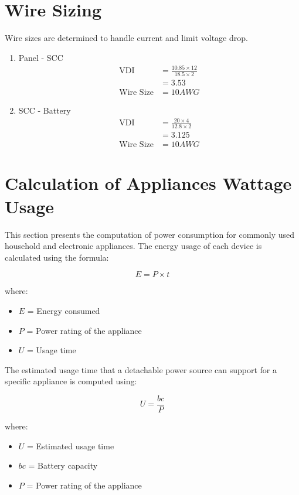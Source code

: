 \section*{Wire Sizing}
Wire sizes are determined to handle current and limit voltage drop.  
\begin{enumerate}[label=\alph*.]
	\item Panel - SCC
	\begin{align*}
		\text{VDI} &= \frac{10.85 \times 12}{18.5 \times 2} \\
		&= 3.53\\
		\text{Wire Size} &= 10AWG
	\end{align*}
	\item SCC - Battery
	\begin{align*}
		\text{VDI} &= \frac{20 \times 4}{12.8 \times 2} \\
		&= 3.125\\
		\text{Wire Size} &= 10AWG
	\end{align*}
\end{enumerate}

\section*{Calculation of Appliances Wattage Usage}

This section presents the computation of power consumption for commonly used household and electronic appliances. The energy usage of each device is calculated using the formula:

\begin{equation}
	E = P \times t
\end{equation}

where:
\begin{itemize}
	\item $E$ = Energy consumed 
	\item $P$ = Power rating of the appliance 
	\item $U$ = Usage time 
\end{itemize}

The estimated usage time that a detachable power source can support for a specific appliance is computed using:

\begin{equation}
	U = \frac{bc}{P}
\end{equation}

where:
\begin{itemize}
	\item $U$ = Estimated usage time 
	\item $bc$ = Battery capacity 
	\item $P$ = Power rating of the appliance
\end{itemize}


